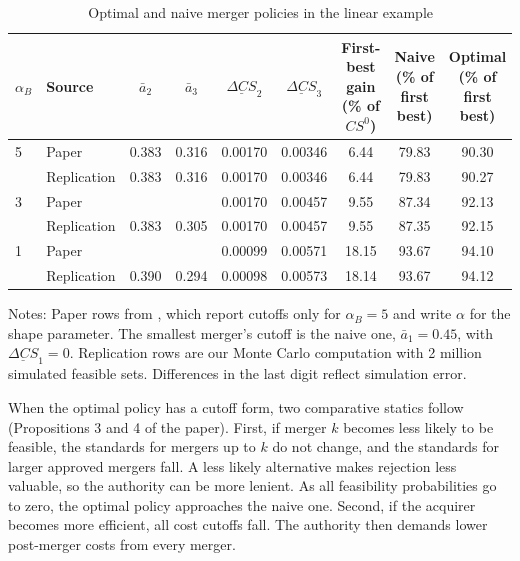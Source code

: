 \begin{table}[htbp]
\centering
\caption{Optimal and naive merger policies in the linear example}
\label{tab:11-nwex}
\begin{threeparttable}
\small
\setlength{\tabcolsep}{4.5pt}
\begin{tabular}{@{}llccccccc@{}}
\toprule
$\alpha_B$ & Source & $\bar a_2$ & $\bar a_3$ & $\underline{\Delta\mathit{CS}}_2$ & $\underline{\Delta\mathit{CS}}_3$ &
\makecell{First-best gain\\ (\% of $\mathit{CS}^0$)} & \makecell{Naive\\ (\% of first best)} &
\makecell{Optimal\\ (\% of first best)} \\
\midrule
5 & Paper & 0.383 & 0.316 & 0.00170 & 0.00346 & 6.44 & 79.83 & 90.30 \\
 & Replication & 0.383 & 0.316 & 0.00170 & 0.00346 & 6.44 & 79.83 & 90.27 \\
3 & Paper & & & 0.00170 & 0.00457 & 9.55 & 87.34 & 92.13 \\
 & Replication & 0.383 & 0.305 & 0.00170 & 0.00457 & 9.55 & 87.35 & 92.15 \\
1 & Paper & & & 0.00099 & 0.00571 & 18.15 & 93.67 & 94.10 \\
 & Replication & 0.390 & 0.294 & 0.00098 & 0.00573 & 18.14 & 93.67 & 94.12 \\
\bottomrule
\end{tabular}
\begin{tablenotes}[flushleft]
\footnotesize
\item Notes: Paper rows from \citet[Example 2 and Table 1]{NockeWhinston2013}, which report cutoffs only for $\alpha_B = 5$
and write $\alpha$ for the shape parameter. The smallest merger's cutoff is the naive one, $\bar a_1 = 0.45$, with
$\underline{\Delta\mathit{CS}}_1 = 0$. Replication rows are our Monte Carlo computation with 2 million simulated feasible
sets. Differences in the last digit reflect simulation error.
\end{tablenotes}
\end{threeparttable}
\end{table}

When the optimal policy has a cutoff form, two comparative statics follow (Propositions 3 and 4 of the paper). First, if
merger $k$ becomes less likely to be feasible, the standards for mergers up to $k$ do not change, and the standards for
larger approved mergers fall. A less likely alternative makes rejection less valuable, so the authority can be more
lenient. As all feasibility probabilities go to zero, the optimal policy approaches the naive one. Second, if the
acquirer becomes more efficient, all cost cutoffs fall. The authority then demands lower post-merger costs from every
merger.

